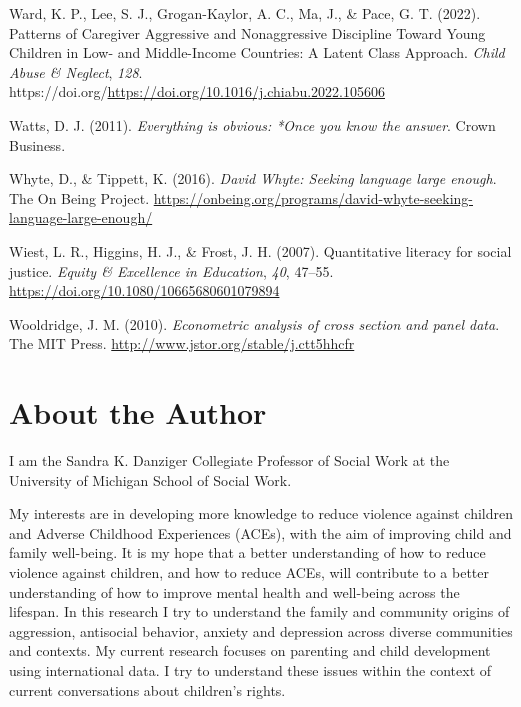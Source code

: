 \documentclass[
  letterpaper,
  DIV=11,
  numbers=noendperiod]{scrreprt}
\newlength{\cslhangindent}
\newlength{\cslentryspacingunit} %
\newenvironment{CSLReferences}[2] %
 {%
  \setlength{\parindent}{0pt}
  \ifodd #1
  \let\oldpar\par
  \def\par{\hangindent=\cslhangindent\oldpar}
  \fi
  \setlength{\parskip}{#2\cslentryspacingunit}
 }%
 {}
\begin{document}
\begin{CSLReferences}{1}{0}
\leavevmode{}%
Ward, K. P., Lee, S. J., Grogan-Kaylor, A. C., Ma, J., \& Pace, G. T.
(2022). {Patterns of Caregiver Aggressive and Nonaggressive Discipline
Toward Young Children in Low- and Middle-Income Countries: A Latent
Class Approach}. \emph{Child Abuse \& Neglect}, \emph{128}.
https://doi.org/\url{https://doi.org/10.1016/j.chiabu.2022.105606}

\leavevmode{}%
Watts, D. J. (2011). \emph{Everything is obvious: *Once you know the
answer}. Crown Business.

\leavevmode{}%
Whyte, D., \& Tippett, K. (2016). \emph{{D}avid {W}hyte: Seeking
language large enough}. The On Being Project.
\url{https://onbeing.org/programs/david-whyte-seeking-language-large-enough/}

\leavevmode{}%
Wiest, L. R., Higgins, H. J., \& Frost, J. H. (2007). Quantitative
literacy for social justice. \emph{Equity \& Excellence in Education},
\emph{40}, 47--55. \url{https://doi.org/10.1080/10665680601079894}

\leavevmode{}%
Wooldridge, J. M. (2010). \emph{Econometric analysis of cross section
and panel data}. The MIT Press.
\url{http://www.jstor.org/stable/j.ctt5hhcfr}

\end{CSLReferences}


\hypertarget{about-the-author}{%
\chapter{About the Author}\label{about-the-author}}

I am the Sandra K. Danziger Collegiate Professor of Social Work at the
University of Michigan School of Social Work.

My interests are in developing more knowledge to reduce violence against
children and Adverse Childhood Experiences (ACEs), with the aim of
improving child and family well-being. It is my hope that a better
understanding of how to reduce violence against children, and how to
reduce ACEs, will contribute to a better understanding of how to improve
mental health and well-being across the lifespan. In this research I try
to understand the family and community origins of aggression, antisocial
behavior, anxiety and depression across diverse communities and
contexts. My current research focuses on parenting and child development
using international data. I try to understand these issues within the
context of current conversations about children's rights.
\end{document}
